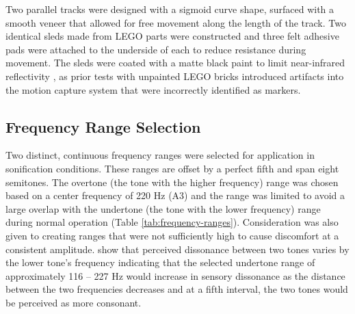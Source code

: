 \documentclass[10pt,a4paper,onecolumn]{article}
\begin{document}
Two parallel tracks were designed with a sigmoid curve shape, surfaced with a smooth veneer that allowed for free movement along the length of the track. Two identical sleds made from LEGO parts were constructed and three felt adhesive pads were attached to the underside of each to reduce resistance during movement. The sleds were coated with a matte black paint to limit near-infrared reflectivity \autocite{benedictSurveyMaterialsCoatings2016}, as prior tests with unpainted LEGO bricks introduced artifacts into the motion capture system that were incorrectly identified as markers.

\hypertarget{frequency-range-selection}{%
\subsection{Frequency Range Selection}\label{frequency-range-selection}}

Two distinct, continuous frequency ranges were selected for application in sonification conditions. These ranges are offset by a perfect fifth and span eight semitones. The overtone (the tone with the higher frequency) range was chosen based on a center frequency of 220 Hz (A3) and the range was limited to avoid a large overlap with the undertone (the tone with the lower frequency) range during normal operation (Table \ref{tab:frequency-ranges}). Consideration was also given to creating ranges that were not sufficiently high to cause discomfort at a consistent amplitude. \textcite{setharesSoundSound2005} show that perceived dissonance between two tones varies by the lower tone's frequency indicating that the selected undertone range of approximately 116 -- 227 Hz would increase in sensory dissonance as the distance between the two frequencies decreases and at a fifth interval, the two tones would be perceived as more consonant.
\end{document}
